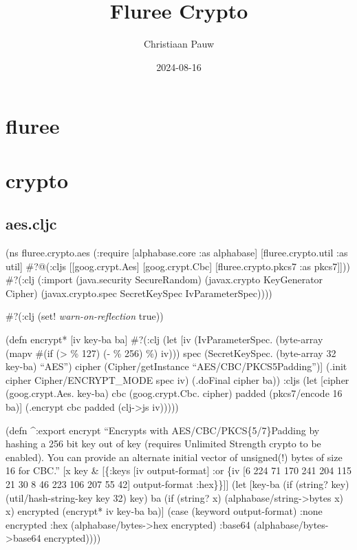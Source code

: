 \documentclass[
]{article}
\title{Fluree Crypto}
\author{Christiaan Pauw}
\date{2024-08-16}
\begin{document}
\maketitle

{
\setcounter{tocdepth}{2}
\tableofcontents
}
\section{fluree}\label{fluree}

\section{crypto}\label{crypto}

\subsection{aes.cljc}\label{aes.cljc}

(ns fluree.crypto.aes (:require {[}alphabase.core :as alphabase{]}
{[}fluree.crypto.util :as util{]} \#?@(:cljs {[}{[}goog.crypt.Aes{]}
{[}goog.crypt.Cbc{]} {[}fluree.crypto.pkcs7 :as pkcs7{]}{]})) \#?(:clj
(:import (java.security SecureRandom) (javax.crypto KeyGenerator Cipher)
(javax.crypto.spec SecretKeySpec IvParameterSpec))))

\#?(:clj (set! \emph{warn-on-reflection} true))

(defn encrypt* {[}iv key-ba ba{]} \#?(:clj (let {[}iv (IvParameterSpec.
(byte-array (mapv \#(if (\textgreater{} \% 127) (- \% 256) \%) iv)))
spec (SecretKeySpec. (byte-array 32 key-ba) ``AES'') cipher
(Cipher/getInstance ``AES/CBC/PKCS5Padding''){]} (.init cipher
Cipher/ENCRYPT\_MODE spec iv) (.doFinal cipher ba)) :cljs (let {[}cipher
(goog.crypt.Aes. key-ba) cbc (goog.crypt.Cbc. cipher) padded
(pkcs7/encode 16 ba){]} (.encrypt cbc padded (clj-\textgreater js
iv)))))

(defn \^{}:export encrypt ``Encrypts with AES/CBC/PKCS\{5/7\}Padding by
hashing a 256 bit key out of key (requires Unlimited Strength crypto to
be enabled). You can provide an alternate initial vector of unsigned(!)
bytes of size 16 for CBC.'' {[}x key \& {[}\{:keys {[}iv
output-format{]} :or \{iv {[}6 224 71 170 241 204 115 21 30 8 46 223 106
207 55 42{]} output-format :hex\}\}{]}{]} (let {[}key-ba (if (string?
key) (util/hash-string-key key 32) key) ba (if (string? x)
(alphabase/string-\textgreater bytes x) x) encrypted (encrypt* iv key-ba
ba){]} (case (keyword output-format) :none encrypted :hex
(alphabase/bytes-\textgreater hex encrypted) :base64
(alphabase/bytes-\textgreater base64 encrypted))))
\end{document}
